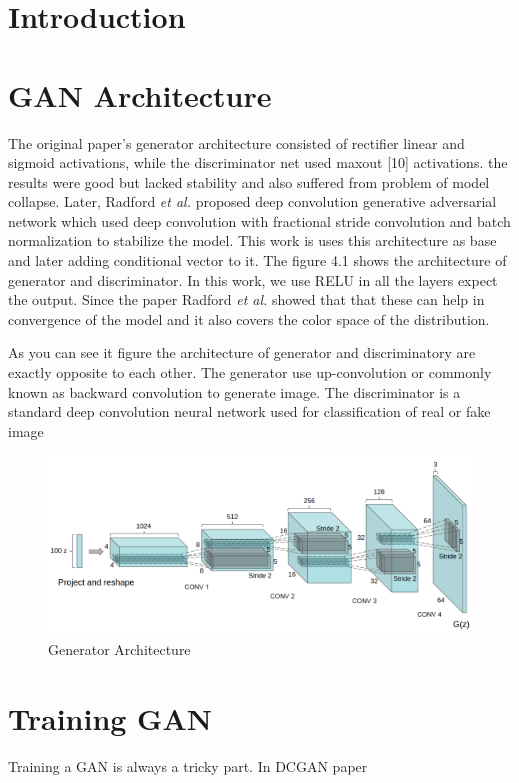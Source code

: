 
\section{Introduction}

\section{GAN Architecture} 

The original paper's\cite{Original-GAN} generator architecture consisted of  rectifier linear\cite{RELU} and sigmoid activations, while the discriminator net used maxout [10] activations. the results were good but lacked stability and also suffered from problem of model collapse.
Later, Radford \textit{et al.}\cite{DCGAN} proposed deep convolution generative adversarial network which used deep convolution with fractional stride convolution and batch normalization to stabilize the model. This work is uses this architecture as base and later adding conditional vector to it. The figure 4.1 shows the architecture of generator and discriminator. In this work, we use RELU
in all the layers expect the output. Since the paper Radford \textit{et al.}\cite{DCGAN} showed that that these can help in convergence of the model and it also covers the color space of the distribution.
\par

As you can see it figure the architecture of generator and discriminatory are exactly opposite to each other. The generator use up-convolution or commonly known as backward convolution to generate image.%
The discriminator is a standard deep convolution neural network used for classification of real or fake image
\begin{figure}
  \centering
    \includegraphics[scale=.7, angle=0]{Files/Generator-Architecture.png}
    \caption[Generator Architecture]{Generator Architecture\cite{DCGAN}}
    \label{fig: DCGAN}
\end{figure}

\section{Training GAN}

Training a GAN is always a tricky part. In DCGAN paper